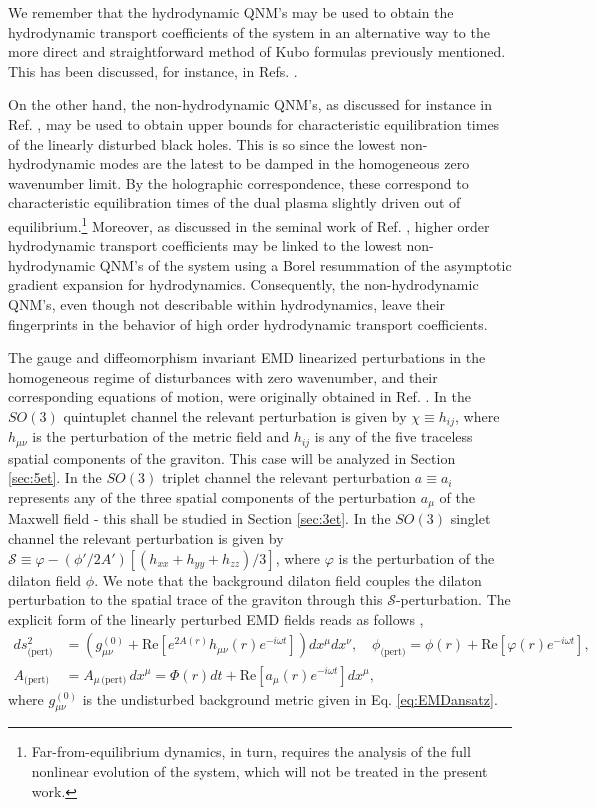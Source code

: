 \documentclass[aps,prd,showkeys,superscriptaddress,singlecolumn,nofootinbib,floatfix]{revtex4-1}
\begin{document}
We remember that the hydrodynamic QNM's may be used to obtain the hydrodynamic transport coefficients of the system in an alternative way to the more direct and straightforward method of Kubo formulas previously mentioned. This has been discussed, for instance, in Refs. \cite{Policastro:2002se,Policastro:2002tn,Janik:2016btb,Heller:2013fn}.

On the other hand, the non-hydrodynamic QNM's, as discussed for instance in Ref. \cite{Horowitz:1999jd}, may be used to obtain upper bounds for characteristic equilibration times of the linearly disturbed black holes. This is so since the lowest non-hydrodynamic modes are the latest to be damped in the homogeneous zero wavenumber limit. By the holographic correspondence, these correspond to characteristic equilibration times of the dual plasma slightly driven out of equilibrium.\footnote{Far-from-equilibrium dynamics, in turn, requires the analysis of the full nonlinear evolution of the system, which will not be treated in the present work.} Moreover, as discussed in the seminal work of Ref. \cite{Heller:2013fn}, higher order hydrodynamic transport coefficients may be linked to the lowest non-hydrodynamic QNM's of the system using a Borel resummation of the asymptotic gradient expansion for hydrodynamics. Consequently, the non-hydrodynamic QNM's, even though not describable within hydrodynamics, leave their fingerprints in the behavior of high order hydrodynamic transport coefficients.

The gauge and diffeomorphism invariant EMD linearized perturbations in the homogeneous regime of disturbances with zero wavenumber, and their corresponding equations of motion, were originally obtained in Ref. \cite{DeWolfe:2011ts}. In the $SO(3)$ quintuplet channel the relevant perturbation is given by $\chi\equiv h_{ij}$, where $h_{\mu\nu}$ is the perturbation of the metric field and $h_{ij}$ is any of the five traceless spatial components of the graviton. This case will be analyzed in Section \ref{sec:5et}. In the $SO(3)$ triplet channel the relevant perturbation $a\equiv a_i$ represents any of the three spatial components of the perturbation $a_\mu$ of the Maxwell field - this shall be studied in Section \ref{sec:3et}. In the $SO(3)$ singlet channel the relevant perturbation is given by $\mathcal{S}\equiv\varphi-\left(\phi'/2A'\right)\left[(h_{xx}+h_{yy}+h_{zz})/3\right]$, where $\varphi$ is the perturbation of the dilaton field $\phi$. We note that the background dilaton field couples the dilaton perturbation to the spatial trace of the graviton through this $\mathcal{S}$-perturbation. The explicit form of the linearly perturbed EMD fields reads as follows \cite{DeWolfe:2011ts},
\begin{align}
ds_{\textrm{(pert)}}^2&=\left(g_{\mu\nu}^{(0)}+\textrm{Re}\left[e^{2A(r)}h_{\mu\nu}(r)e^{-i\omega t}\right]\right)dx^\mu dx^\nu, \quad
\phi_{\textrm{(pert)}}=\phi(r)+\textrm{Re}\left[\varphi(r)e^{-i\omega t}\right],\nonumber\\
A_{\textrm{(pert)}}&=A_{\mu\,\textrm{(pert)}}\,dx^\mu=\Phi(r)dt +\textrm{Re}\left[a_\mu(r)e^{-i\omega t}\right]dx^\mu, \label{eq:EMDpert}
\end{align}
where $g_{\mu\nu}^{(0)}$ is the undisturbed background metric given in Eq. \eqref{eq:EMDansatz}.
\end{document}
